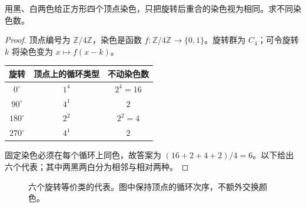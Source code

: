 \documentclass[lang=cn,a4paper,fontset=none,zihao=false,10pt,openany,twoside]{beautybook}
\numberwithin{algorithm}{chapter}
\begin{document}
\begin{example}[正方形顶点的两色染色]\label{ex:square-rotation-colours}
用黑、白两色给正方形四个顶点染色，只把旋转后重合的染色视为相同。求不同染色数。
\end{example}
\begin{proof}
顶点编号为 $\mathbb Z/4\mathbb Z$，染色是函数 $f:\mathbb Z/4\mathbb Z\to\{0,1\}$。旋转群为 $C_4$；可令旋转 $k$ 将染色变为 $x\mapsto f(x-k)$。
\begin{center}
\begin{tabular}{@{}ccc@{}}
\toprule
旋转 & 顶点上的循环类型 & 不动染色数\\
\midrule
$0^\circ$ & $1^4$ & $2^4=16$\\
$90^\circ$ & $4^1$ & $2$\\
$180^\circ$ & $2^2$ & $2^2=4$\\
$270^\circ$ & $4^1$ & $2$\\
\bottomrule
\end{tabular}
\end{center}
固定染色必须在每个循环上同色，故答案为 $(16+2+4+2)/4=6$。以下给出六个代表；其中两黑两白分为相邻与相对两种。
\end{proof}
\begin{figure}[H]
\centering
{}
\caption{六个旋转等价类的代表。图中保持顶点的循环次序，不额外交换颜色。}
\end{figure}
\end{document}
